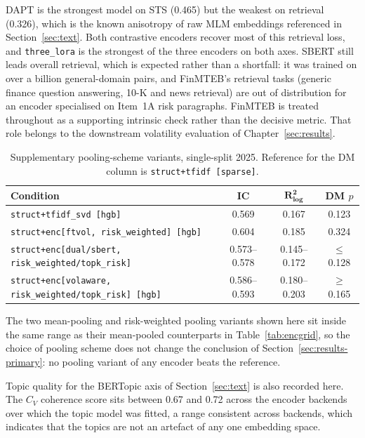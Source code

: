 \documentclass[logo,msc,ai]{infthesis}        %
\begin{document}
DAPT is the strongest model on STS (0.465) but the weakest on retrieval (0.326), which is the known anisotropy of raw MLM embeddings referenced in Section~\ref{sec:text}. Both contrastive encoders recover most of this retrieval loss, and \texttt{three\_lora} is the strongest of the three encoders on both axes. SBERT still leads overall retrieval, which is expected rather than a shortfall: it was trained on over a billion general-domain pairs, and FinMTEB's retrieval tasks (generic finance question answering, 10-K and news retrieval) are out of distribution for an encoder specialised on Item~1A risk paragraphs. FinMTEB is treated throughout as a supporting intrinsic check rather than the decisive metric. That role belongs to the downstream volatility evaluation of Chapter~\ref{sec:results}.

\begin{table}[h]
\centering
\footnotesize
\caption{Supplementary pooling-scheme variants, single-split 2025. Reference for the DM column is \texttt{struct+tfidf [sparse]}.}
\label{tab:pooling}
\begin{tabular}{@{}L{6.6cm}ccc@{}}
\toprule
\textbf{Condition} & \textbf{IC} & $\mathbf{R^2_{\log}}$ & \textbf{DM $p$} \\
\midrule
\texttt{struct+tfidf\_svd [hgb]} & 0.569 & 0.167 & 0.123 \\
\texttt{struct+enc[ftvol, risk\_weighted] [hgb]} & 0.604 & 0.185 & 0.324 \\
\texttt{struct+enc[dual/sbert, risk\_weighted/topk\_risk]} & 0.573--0.578 & 0.145--0.172 & $\leq$0.128 \\
\texttt{struct+enc[volaware, risk\_weighted/topk\_risk] [hgb]} & 0.586--0.593 & 0.180--0.203 & $\geq$0.165 \\
\bottomrule
\end{tabular}
\end{table}

The two mean-pooling and risk-weighted pooling variants shown here sit inside the same range as their mean-pooled counterparts in Table~\ref{tab:encgrid}, so the choice of pooling scheme does not change the conclusion of Section~\ref{sec:results-primary}: no pooling variant of any encoder beats the reference.

Topic quality for the BERTopic axis of Section~\ref{sec:text} is also recorded here. The $C_V$ coherence score sits between 0.67 and 0.72 across the encoder backends over which the topic model was fitted, a range consistent across backends, which indicates that the topics are not an artefact of any one embedding space.
\end{document}
